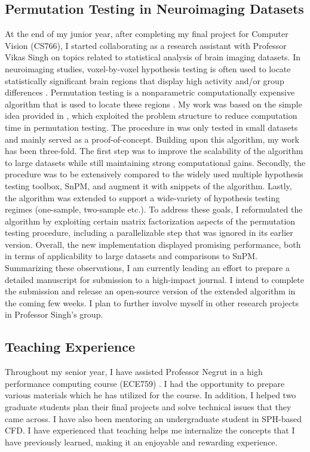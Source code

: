 \documentclass{article}
\theoremstyle{definition}
\begin{document}
\subsection*{Permutation Testing in Neuroimaging Datasets}

At the end of my junior year, after completing my final project for Computer Vision (CS766), I started collaborating as a research assistant with Professor Vikas Singh on topics related to statistical analysis of brain imaging datasets. In neuroimaging studies, voxel-by-voxel hypothesis testing is often used  to locate statistically significant brain regions that display high activity and/or group differences \cite{Holmes96}. Permutation testing is a nonparametric computationally expensive algorithm that is used to locate these regions \cite{Holmes96, Nichols02, Ithapu13}. My work was based on the simple idea provided in \cite{Ithapu13}, which exploited the problem structure to reduce computation time in permutation testing. The procedure in \cite{Ithapu13} was only tested in small datasets and mainly served as a proof-of-concept. Building upon this algorithm, my work has been three-fold. The first step was to improve the scalability of the algorithm to large datasets while still maintaining strong computational gains. Secondly, the procedure was to be extensively compared to the widely used multiple hypothesis testing toolbox, SnPM\cite{SnPM}, and augment it with snippets of the algorithm. Lastly, the algorithm was extended to support a wide-variety of hypothesis testing regimes (one-sample, two-sample etc.). To address these goals, I reformulated the algorithm by exploiting certain matrix factorization aspects of the permutation testing procedure, including a parallelizable step that was ignored in its earlier version. Overall, the new implementation displayed promising performance, both in terms of applicability to large datasets and comparisons to SnPM. Summarizing these observations, I am currently leading an effort to prepare a detailed manuscript for submission to a high-impact journal. I intend to complete the submission and release an open-source version of the extended algorithm in the coming few weeks. I plan to further involve myself in other research projects in Professor Singh's group. 

\subsection*{Teaching Experience}

Throughout my senior year, I have assisted Professor Negrut in a high performance computing course (ECE759) \cite{me759}. I had the opportunity to prepare various materials which he has utilized for the course. In addition, I helped two graduate students plan their final projects and solve technical issues that they came across. I have also been mentoring an undergraduate student in SPH-based CFD. I have experienced that teaching helps me internalize the concepts that I have previously learned, making it an enjoyable and rewarding experience.
\end{document}
